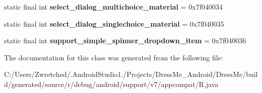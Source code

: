 \begin{DoxyCompactItemize}
\item 
\hypertarget{classandroid_1_1support_1_1v7_1_1appcompat_1_1_r_1_1layout_adaf8230a8b0f528256d97c8817a7ea3c}{}static final int {\bfseries select\+\_\+dialog\+\_\+multichoice\+\_\+material} = 0x7f040034\label{classandroid_1_1support_1_1v7_1_1appcompat_1_1_r_1_1layout_adaf8230a8b0f528256d97c8817a7ea3c}

\item 
\hypertarget{classandroid_1_1support_1_1v7_1_1appcompat_1_1_r_1_1layout_a5310ca432c171907a158a12388549c4b}{}static final int {\bfseries select\+\_\+dialog\+\_\+singlechoice\+\_\+material} = 0x7f040035\label{classandroid_1_1support_1_1v7_1_1appcompat_1_1_r_1_1layout_a5310ca432c171907a158a12388549c4b}

\item 
\hypertarget{classandroid_1_1support_1_1v7_1_1appcompat_1_1_r_1_1layout_ad5f037f06366e908921922a2df0a8133}{}static final int {\bfseries support\+\_\+simple\+\_\+spinner\+\_\+dropdown\+\_\+item} = 0x7f040036\label{classandroid_1_1support_1_1v7_1_1appcompat_1_1_r_1_1layout_ad5f037f06366e908921922a2df0a8133}

\end{DoxyCompactItemize}


The documentation for this class was generated from the following file\+:\begin{DoxyCompactItemize}
\item 
C\+:/\+Users/\+Zwretched/.\+Android\+Studio1./\+Projects/\+Dress\+Me\+\_\+\+Android/\+Dress\+Me/build/generated/source/r/debug/android/support/v7/appcompat/R.\+java\end{DoxyCompactItemize}

